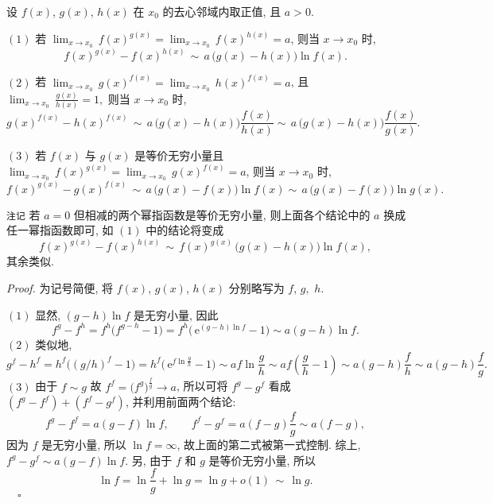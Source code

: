


\begin{theorem}{}
设 $f(x)$, $g(x)$, $h(x)$ 在 $x_{0}$ 的去心邻域内取正值,
且 $a>0$. 

$(1)$ 若 ${\displaystyle \lim_{x\to x_{0}}}\,f(x)^{g(x)}={\displaystyle \lim_{x\to x_{0}}}\,f(x)^{h(x)}=a$,
则当 $x\to x_{0}$ 时, 
$$
f(x)^{g(x)}-f(x)^{h(x)}\,\sim\,a\,\big(g(x)-h(x)\big)\ln f(x).~
$$
 

$(2)$ 若 ${\displaystyle {\displaystyle \lim_{x\to x_{0}}}\,}g(x)^{f(x)}={\displaystyle \lim_{x\to x_{0}}}\,h(x)^{f(x)}=a$,
且 ${\displaystyle \lim_{x\to x_{0}}}\,{\displaystyle \frac{g(x)}{h(x)}}=1,$
则当 $x\to x_{0}$ 时, 
\[
g(x)^{f(x)}-h(x)^{f(x)}\,\sim\,a\,\big(g(x)-h(x)\big)\frac{f(x)}{h(x)}\sim\,a\,\big(g(x)-h(x)\big)\frac{f(x)}{g(x)}.~
\]

$(3)$ 若 $f(x)$ 与 $g(x)$ 是等价无穷小量且 ${\displaystyle {\displaystyle \lim_{x\to x_{0}}}\,}f(x)^{g(x)}={\displaystyle \lim_{x\to x_{0}}}\,g(x)^{f(x)}=a$,
则当 $x\to x_{0}$ 时, 
\[
f(x)^{g(x)}-g(x)^{f(x)}\,\sim\,a\,\big(g(x)-f(x)\big)\ln f(x)\sim\,a\,\big(g(x)-f(x)\big)\ln g(x).~
\]

\verb`注记`
若 $a=0$ 但相减的两个幂指函数是等价无穷小量, 则上面各个结论中的 $a$ 换成任一幂指函数即可, 如 $(1)$ 中的结论将变成
\[
f(x)^{g(x)}-f(x)^{h(x)}\,\sim\,f(x)^{g(x)}\,\big(g(x)-h(x)\big)\ln f(x),~
\]
其余类似. 

\end{theorem}


\textsl{Proof.} 为记号简便, 将 $f(x)$, $g(x)$, $h(x)$ 分别略写为 $f$, $g,$ $h$. 

$(1)$ 显然, $(g-h)\ln f$ 是无穷小量, 因此
\[
f^{g}-f^{h}=f^{h}\big(f^{g-h}-1\big)=f^{h}\big(\,\mathrm{e}^{(g-h)\ln f}-1\big)\sim a(g-h)\ln f.~
\]
 $(2)$ 类似地, 
\[g^{f}-h^{f}=h^{f}\big((g/h)^{f}-1\big)=h^{f}\big(\,\mathrm{e}^{f\ln\frac{g}{h}}-1\big)\sim af\ln\frac{g}{h}\sim af\left(\frac{g}{h}-1\right)\sim a(g-h)\frac{f}{h}\sim a(g-h)\frac{f}{g}.~\]
 $(3)$ 由于 $f\sim g$ 故 $f^{f}=\big(f^{g}\big)^{\frac{f}{g}}\to a$,
所以可将 $f^{g}-g^{f}$ 看成 $(f^{g}-f^{f})+(f^{f}-g^{f})$, 并利用前面两个结论: 
\[
f^{g}-f^{f}=a(g-f)\ln f,\qquad f^{f}-g^{f}=a(f-g)\frac{f}{g}\sim a(f-g),~
\]
因为 $f$ 是无穷小量, 所以 $\ln f=\infty$, 故上面的第二式被第一式控制. 综上, $f^{g}-g^{f}\sim a(g-f)\ln f.$ 另, 由于 $f$ 和 $g$ 是等价无穷小量, 所以
\[
\ln f=\ln\frac{f}{g}+\ln g=\ln g+o(1)\,\sim\,\ln g.~
\]$\quad\square$

